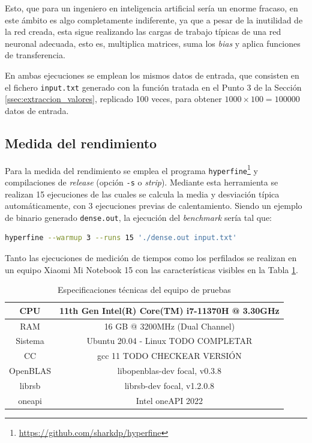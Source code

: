 Esto, que para un ingeniero en inteligencia artificial sería un enorme fracaso, en este ámbito es algo completamente indiferente, ya que a pesar de la inutilidad de la red creada, esta sigue realizando las cargas de trabajo típicas de una red neuronal adecuada, esto es, multiplica matrices, suma los \textit{bias} y aplica funciones de transferencia.

En ambas ejecuciones se emplean los mismos datos de entrada, que consisten en el fichero \texttt{input.txt} generado con la función tratada en el Punto 3 de la Sección \ref{ssec:extraccion_valores}, replicado 100 veces, para obtener $1000 \times 100 = 100000$ datos de entrada.

\subsection{Medida del rendimiento}
\label{ssec:medida_rendimiento_metodologia}
Para la medida del rendimiento se emplea el programa \texttt{hyperfine}\footnote{\url{https://github.com/sharkdp/hyperfine}} y compilaciones de \textit{release} (opción \texttt{-s} o \textit{strip}). Mediante esta herramienta se realizan 15 ejecuciones de las cuales se calcula la media y desviación típica automáticamente, con 3 ejecuciones previas de calentamiento. Siendo un ejemplo de binario generado \texttt{dense.out}, la ejecución del \textit{benchmark} sería tal que:\medskip
\begin{lstlisting}[language=bash]
hyperfine --warmup 3 --runs 15 './dense.out input.txt'
\end{lstlisting}

Tanto las ejecuciones de medición de tiempos como los perfilados se realizan en un equipo Xiaomi Mi Notebook 15 con las características visibles en la Tabla \ref{tb:especificaciones_xiaomi}.
\begin{table}
\centering
\begin{tabular}{|c|c|}
    \hline
    CPU & 11th Gen Intel(R) Core(TM) i7-11370H @ 3.30GHz\\\hline
    RAM & 16 GB @ 3200MHz (Dual Channel)\\\hline
    Sistema & Ubuntu 20.04 - Linux TODO COMPLETAR\\\hline
    CC & gcc 11 TODO CHECKEAR VERSIÓN\\\hline
    OpenBLAS & libopenblas-dev focal, v0.3.8\\\hline
    librsb & librsb-dev focal, v1.2.0.8\\\hline
    oneapi & Intel oneAPI 2022\\\hline
\end{tabular}
\caption{\label{tb:especificaciones_xiaomi}Especificaciones técnicas del equipo de pruebas}
\end{table}


